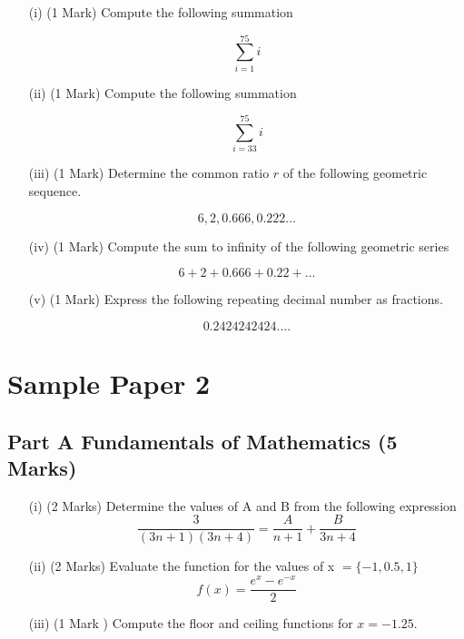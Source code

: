 \documentclass[]{article}
\begin{document}
\begin{enumerate}
	\item[(i)](1 Mark)  Compute the following summation
	
	\[ \sum_{i=1}^{75} i \]
	
	\item[(ii)](1 Mark) Compute the following summation
	
	\[ \sum_{i=33}^{75} i \]
	
	
	\item[(iii)](1 Mark) Determine the common ratio $r$ of the following geometric sequence. 
	
	
	\[ 6, 2, 0.666 , 0.222\ldots \]
	
	\item[(iv)](1 Mark) Compute the sum to infinity of the following geometric series
	
	\[ 6 + 2 + 0.666 + 0.22 +\ldots \]
	
	\item[(v)] (1 Mark) Express the following repeating decimal number as fractions.
	
	\[0.2424242424....\]
\end{enumerate}


\newpage

\section*{Sample Paper 2}
\subsection*{Part A Fundamentals of Mathematics (5 Marks) } %

\begin{itemize}
	\item[(i)] (2 Marks) Determine the values of A and B from the following expression
	\[  \frac{3}{(3n+1)(3n+4)} = \frac{A}{n+1} + \frac{B}{3n+4}\]
	
	
	\item[(ii)] (2 Marks) Evaluate the function for the values of x $=\{ -1, 0.5 , 1 \}$ %
	\[  f(x) = \frac{e^x - e^{-x} }{2} \]
	
	
	\item[(iii)] (1 Mark )  Compute the floor and ceiling functions for $x= -1.25$. %
\end{itemize}
\newpage
\end{document}

